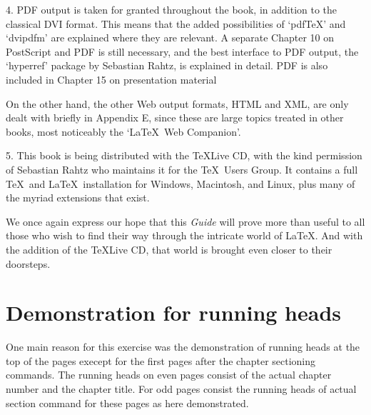 \documentclass[twoside]{report}
\begin{document}
4. PDF output is taken for granted throughout the book, in addition to the
  classical DVI format. This means that the added possibilities of `pdf\TeX'
  and `dvipdfm' are explained where they are relevant. A separate
  Chapter 10 on PostScript and PDF is still necessary, and the
  best interface to PDF output, the `hyperref' package by Sebastian
  Rahtz, is explained in detail. PDF is also included in
  Chapter 15 on presentation material

  On the other hand, the other Web output formats, HTML and XML, are only
  dealt with briefly in Appendix E, since these are large topics
  treated in other books, most noticeably the `\LaTeX\ Web Companion'.

5. This book is being distributed with the \TeX Live CD, with the kind
  permission of Sebastian Rahtz who maintains it for the \TeX\ Users Group.
  It contains a full \TeX\ and \LaTeX\ installation for Windows, Macintosh,
  and Linux, plus many of the myriad extensions that exist.

We once again express our hope that this \textsl{Guide} will prove more than
useful to all those who wish to find their way through the intricate world of
\LaTeX. And with the addition of the \TeX Live CD, that world is brought even
closer to their doorsteps.

\section{Demonstration for running heads}
One main reason for this exercise was the demonstration of running heads
at the top of the pages execept for the first pages after the 
chapter sectioning commands. The running heads on even pages consist
of the actual chapter number and the chapter title. For odd pages consist
the running heads of actual section command for these pages as here
demonstrated.
\end{document}
